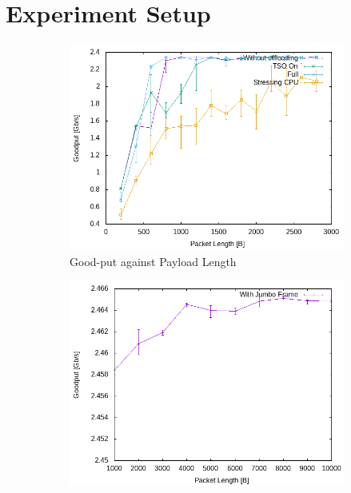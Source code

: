 \documentclass{exam}
\begin{document}
\section{Experiment Setup}

\begin{figure}[H]
    \centering
    \begin{subfigure}[b]{0.40\textwidth}
        \centering
        \includegraphics[width=\textwidth]{iperf/throughput.png}
        \caption{Good-put against Payload Length}
        \label{fig:good}
    \end{subfigure}
    \hfill
        \begin{subfigure}[b]{0.40\textwidth}
        \centering
        \includegraphics[width=\textwidth]{iperf/throughput_j.png}

\end{subfigure}
\end{figure}
\end{document}
